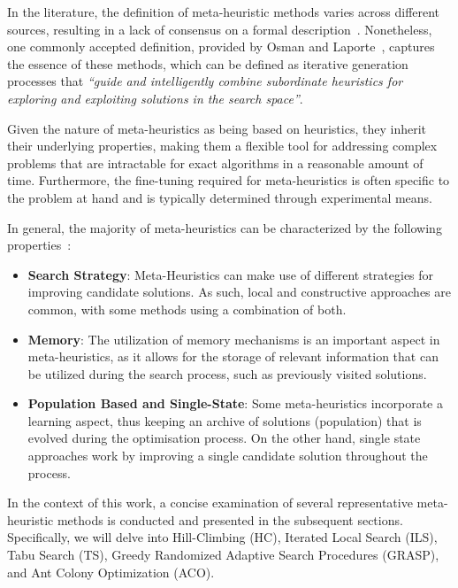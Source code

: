 In the literature, the definition of meta-heuristic methods varies across
different sources, resulting in a lack of consensus on a formal
description~\cite{osman1996metaheuristics,blummetaheuristics,festa2014brief,luke2013essentialsa}.
Nonetheless, one commonly accepted definition, provided by Osman and
Laporte~\cite{osman1996metaheuristics}, captures the essence of these methods,
which can be defined as iterative generation processes that \textit{``guide and
  intelligently combine subordinate heuristics for exploring and exploiting
  solutions in the search space''}.

Given the nature of meta-heuristics as being based on heuristics, they inherit
their underlying properties, making them a flexible tool for addressing complex
problems that are intractable for exact algorithms in a reasonable amount of
time. Furthermore, the fine-tuning required for meta-heuristics is often
specific to the problem at hand and is typically determined through experimental
means.

In general, the majority of meta-heuristics can be characterized by the following
properties~\cite{blummetaheuristics}:
\begin{itemize}
  \item \textbf{Search Strategy}: Meta-Heuristics can make use of different
        strategies for improving candidate solutions. As such, local and
        constructive approaches are common, with some methods using a combination of
        both.

  \item \textbf{Memory}: The utilization of memory mechanisms is an important
        aspect in meta-heuristics, as it allows for the storage of relevant
        information that can be utilized during the search process, such as
        previously visited solutions.

  \item \textbf{Population Based and Single-State}: Some meta-heuristics
        incorporate a learning aspect, thus keeping an archive of solutions
        (population) that is evolved during the optimisation process. On the other
        hand, single state approaches work by improving a single candidate solution
        throughout the process.
\end{itemize}

In the context of this work, a concise examination of several representative
meta-heuristic methods is conducted and presented in the subsequent sections.
Specifically, we will delve into Hill-Climbing (HC), Iterated Local Search
(ILS), Tabu Search (TS), Greedy Randomized Adaptive Search Procedures (GRASP),
and Ant Colony Optimization (ACO).

